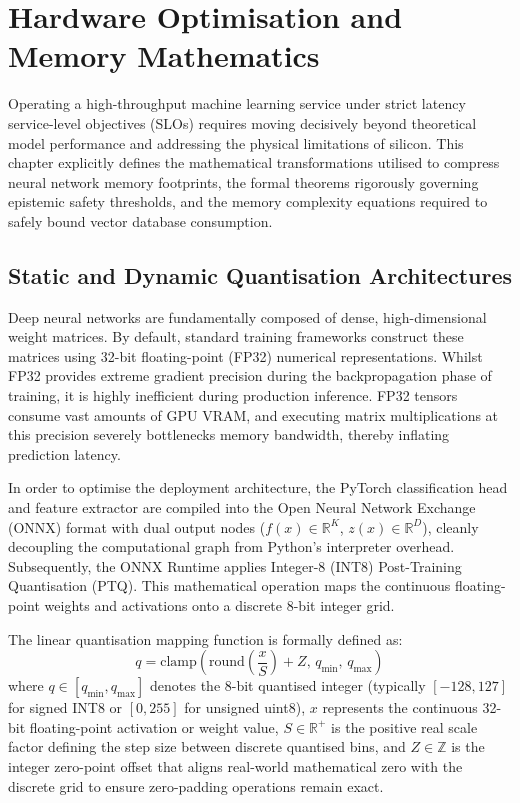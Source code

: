 \chapter{Hardware Optimisation and Memory Mathematics}
\label{ch:hardware_math}

Operating a high-throughput machine learning service under strict latency service-level objectives (SLOs) requires moving decisively beyond theoretical model performance and addressing the physical limitations of silicon. This chapter explicitly defines the mathematical transformations utilised to compress neural network memory footprints, the formal theorems rigorously governing epistemic safety thresholds, and the memory complexity equations required to safely bound vector database consumption.

\section{Static and Dynamic Quantisation Architectures}
\label{sec:quantization_math}

Deep neural networks are fundamentally composed of dense, high-dimensional weight matrices. By default, standard training frameworks construct these matrices using 32-bit floating-point (FP32) numerical representations. Whilst FP32 provides extreme gradient precision during the backpropagation phase of training, it is highly inefficient during production inference. FP32 tensors consume vast amounts of GPU VRAM, and executing matrix multiplications at this precision severely bottlenecks memory bandwidth, thereby inflating prediction latency.

In order to optimise the deployment architecture, the PyTorch classification head and feature extractor are compiled into the Open Neural Network Exchange (ONNX) format with dual output nodes ($f(x) \in \mathbb{R}^K$, $z(x) \in \mathbb{R}^D$), cleanly decoupling the computational graph from Python's interpreter overhead. Subsequently, the ONNX Runtime applies Integer-8 (INT8) Post-Training Quantisation (PTQ). This mathematical operation maps the continuous floating-point weights and activations onto a discrete 8-bit integer grid.

The linear quantisation mapping function is formally defined as:
\begin{equation}
q = \text{clamp}\left( \text{round}\left(\frac{x}{S}\right) + Z, \, q_{\min}, \, q_{\max} \right)
\label{eq:quant_mapping}
\end{equation}
where $q \in [q_{\min}, q_{\max}]$ denotes the 8-bit quantised integer (typically $[-128, 127]$ for signed INT8 or $[0, 255]$ for unsigned uint8), $x$ represents the continuous 32-bit floating-point activation or weight value, $S \in \mathbb{R}^+$ is the positive real scale factor defining the step size between discrete quantised bins, and $Z \in \mathbb{Z}$ is the integer zero-point offset that aligns real-world mathematical zero with the discrete grid to ensure zero-padding operations remain exact.

